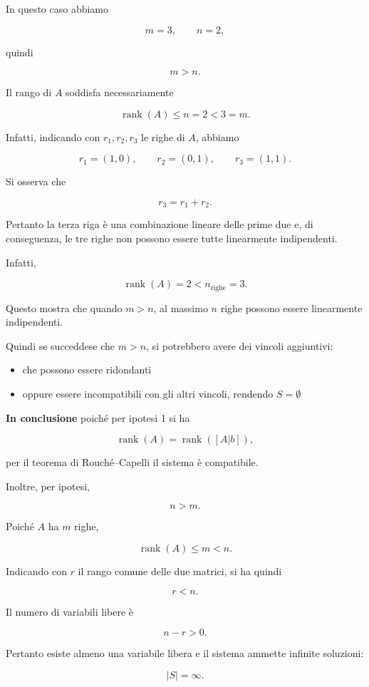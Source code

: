 \begin{itemize}
    In questo caso abbiamo

    $$
    m=3,\qquad n=2,
    $$

    quindi

    $$
    m>n.
    $$

    Il rango di \(A\) soddisfa necessariamente

    $$
    \operatorname{rank}(A)\leq n=2<3=m.
    $$

    Infatti, indicando con \(r_1,r_2,r_3\) le righe di \(A\), abbiamo

    $$
    r_1=(1,0),\qquad
    r_2=(0,1),\qquad
    r_3=(1,1).
    $$

    Si osserva che

    $$
    r_3=r_1+r_2.
    $$

    Pertanto la terza riga è una combinazione lineare delle prime due e, di conseguenza, le tre righe non possono essere tutte linearmente indipendenti.

    Infatti,

    $$
    \operatorname{rank}(A)=2<n_{\text{righe}}=3.
    $$

    Questo mostra che quando \(m>n\), al massimo \(n\) righe possono essere linearmente indipendenti.

    Quindi se succeddese che $m > n$, si potrebbero avere dei vincoli aggiuntivi:
    \begin{itemize}
        \item che possono essere ridondanti
        \item oppure essere incompatibili con gli altri vincoli, rendendo $S = \emptyset$
    \end{itemize}


    \textbf{In conclusione} poiché per ipotesi 1 si ha

    $$
    \operatorname{rank}(A)=\operatorname{rank}([A|b]),
    $$

    per il teorema di Rouché--Capelli il sistema è compatibile.

    Inoltre, per ipotesi,

    $$
    n>m.
    $$

    Poiché \(A\) ha \(m\) righe,

    $$
    \operatorname{rank}(A)\leq m<n.
    $$

    Indicando con \(r\) il rango comune delle due matrici, si ha quindi

    $$
    r<n.
    $$

    Il numero di variabili libere è

    $$
    n-r>0.
    $$

    Pertanto esiste almeno una variabile libera e il sistema ammette infinite soluzioni:

    $$
    \boxed{|S|=\infty}.
    $$

\end{itemize} 
